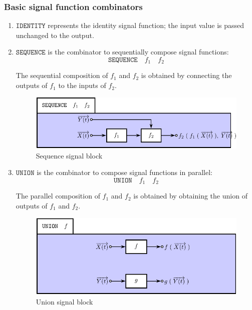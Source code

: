 \documentclass[a4paper]{article}
\begin{document}
\subsubsection{Basic signal function combinators}
\begin{enumerate}

\item $\texttt{IDENTITY}$ represents the identity signal function; the
  input value is passed unchanged to the output.

\item $\texttt{SEQUENCE}$ is the combinator to sequentially compose
  signal functions: \[\texttt{SEQUENCE}\quad{}f_{1}\quad{}f_{2}\]

The sequential composition of $f_{1}$ and $f_{2}$ is obtained by
connecting the outputs of $f_{1}$ to the inputs of $f_{2}$.




\begin{figure}
\includegraphics{figures/SequenceSignalBlock}
\caption{\label{Fig:SequenceSignalBlock}Sequence signal block}
\end{figure}

\item $\texttt{UNION}$ is the combinator to compose
  signal functions in parallel: \[\texttt{UNION}\quad{}f_{1}\quad{}f_{2}\]

The parallel composition of $f_{1}$ and $f_{2}$ is obtained by
obtaining the union of outputs of $f_{1}$ and $f_{2}$.



\begin{figure}
\includegraphics{figures/UnionSignalBlock}
\caption{\label{Fig:UnionSignalBlock}Union signal block}
\end{figure}


\end{enumerate}
\end{document}
